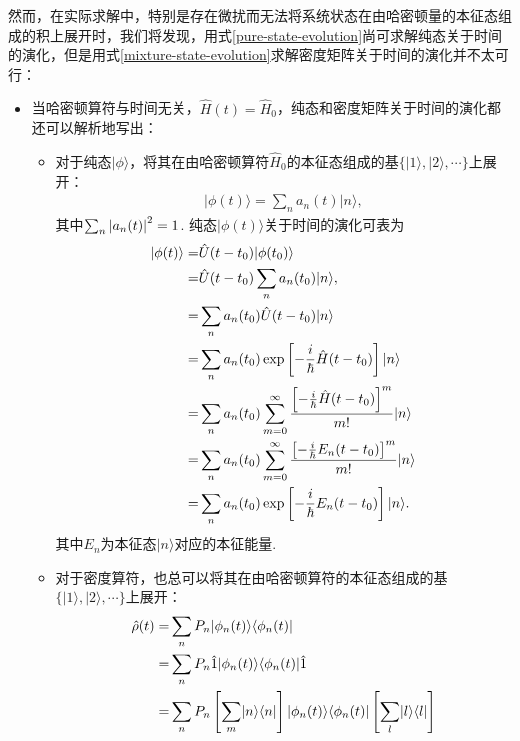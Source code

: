 \documentclass{assignment}
\begin{document}
然而，在实际求解中，特别是存在微扰而无法将系统状态在由哈密顿量的本征态组成的积上展开时，我们将发现，用式\eqref{pure-state-evolution}尚可求解纯态关于时间的演化，但是用式\eqref{mixture-state-evolution}求解密度矩阵关于时间的演化并不太可行：
\begin{itemize}
    \item 当哈密顿算符与时间无关，$\hat{H}(t)=\hat{H}_0$，纯态和密度矩阵关于时间的演化都还可以解析地写出：
    \begin{itemize}
        \item 对于纯态$\lvert\phi\rangle$，将其在由哈密顿算符$\hat{H}_0$的本征态组成的基$\{\lvert 1\rangle,\lvert 2\rangle,\cdots\}$上展开：
        \begin{align}
            \lvert\phi(t)\rangle=\sum_na_n(t)\lvert n\rangle,
        \end{align}
        其中$\sum_n\left\lvert a_n(t)\right\rvert^2=1$. 纯态$\lvert\phi(t)\rangle$关于时间的演化可表为
        \begin{align}
            \notag\lvert\phi(t)\rangle=&\hat{U}(t-t_0)\lvert\phi(t_0)\rangle\\
            \notag=&\hat{U}(t-t_0)\sum_na_n(t_0)\lvert n\rangle,\\
            \notag=&\sum_na_n(t_0)\hat{U}(t-t_0)\lvert n\rangle\\
            \notag=&\sum_na_n(t_0)\exp\left[-\frac{i}{\hbar}\hat{H}(t-t_0)\right]\lvert n\rangle\\
            \notag=&\sum_na_n(t_0)\sum_{m=0}^{\infty}\frac{\left[-\frac{i}{\hbar}\hat{H}(t-t_0)\right]^m}{m!}\lvert n\rangle\\
            \notag=&\sum_na_n(t_0)\sum_{m=0}^{\infty}\frac{\left[-\frac{i}{\hbar}E_n(t-t_0)\right]^m}{m!}\lvert n\rangle\\
            =&\sum_na_n(t_0)\exp\left[-\frac{i}{\hbar}E_n(t-t_0)\right]\lvert n\rangle.
        \end{align}
        其中$E_n$为本征态$\lvert n\rangle$对应的本征能量.
        \item 对于密度算符，也总可以将其在由哈密顿算符的本征态组成的基$\{\lvert 1\rangle,\lvert 2\rangle,\cdots\}$上展开：
        \begin{align}
            \label{density-matrix-expansion-on-basis}
            \notag\hat{\rho}(t)=&\sum_nP_n\lvert\phi_n(t)\rangle\langle\phi_n(t)\rvert\\
            \notag=&\sum_nP_n\hat{1}\lvert\phi_n(t)\rangle\langle\phi_n(t)\rvert\hat{1}\\
            \notag=&\sum_nP_n\left[\sum_m\lvert n\rangle\langle n\rvert\right]\lvert\phi_n(t)\rangle\langle\phi_n(t)\rvert\left[\sum_l\lvert l\rangle\langle l\rvert\right]\\

\end{align}
\end{itemize}
\end{itemize}
\end{document}
